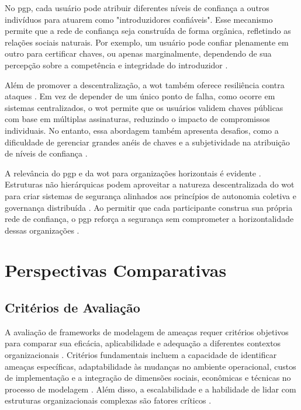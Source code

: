 No \gls{pgp}, cada usuário pode atribuir diferentes níveis de confiança a outros
indivíduos para atuarem como "introduzidores confiáveis". Esse mecanismo permite
que a rede de confiança seja construída de forma orgânica, refletindo as
relações sociais naturais. Por exemplo, um usuário pode confiar plenamente em
outro para certificar chaves, ou apenas marginalmente, dependendo de sua
percepção sobre a competência e integridade do introduzidor \cite{Pgp}.

Além de promover a descentralização, a \gls{wot} também oferece resiliência
contra ataques \cite{Pgp}. Em vez de depender de um único ponto de falha, como ocorre em
sistemas centralizados, o \gls{wot} permite que os usuários validem chaves públicas
com base em múltiplas assinaturas, reduzindo o impacto de compromissos
individuais. No entanto, essa abordagem também apresenta desafios, como a
dificuldade de gerenciar grandes anéis de chaves e a subjetividade na atribuição
de níveis de confiança \cite{Pgp}.

A relevância do \gls{pgp} e da \gls{wot} para organizações horizontais é evidente \cite{Colbac}.
Estruturas não hierárquicas podem aproveitar a natureza descentralizada do \gls{wot}
para criar sistemas de segurança alinhados aos princípios de autonomia coletiva
e governança distribuída . Ao permitir que cada participante construa sua própria
rede de confiança, o \gls{pgp} reforça a segurança sem comprometer a horizontalidade
dessas organizações \cite{EverydayRevolutions, Colbac}.

\section{Perspectivas Comparativas}
\label{sec:comparative_perspectives}

\subsection{Critérios de Avaliação}
\label{subsec:criteria_evaluation}

A avaliação de frameworks de modelagem de ameaças requer critérios
objetivos para comparar sua eficácia, aplicabilidade e adequação a
diferentes contextos organizacionais \cite{EvaluationofCompetingThreatModeling}.
Critérios fundamentais incluem a capacidade de
identificar ameaças específicas, adaptabilidade às
mudanças no ambiente operacional, custos de implementação e a
integração de dimensões sociais, econômicas e técnicas no processo de
modelagem \cite{ThreatModelingASystematicLiteratureReview}.
Além disso, a escalabilidade e a habilidade de lidar com
estruturas organizacionais complexas são fatores críticos \cite{AbcCrypto}.

